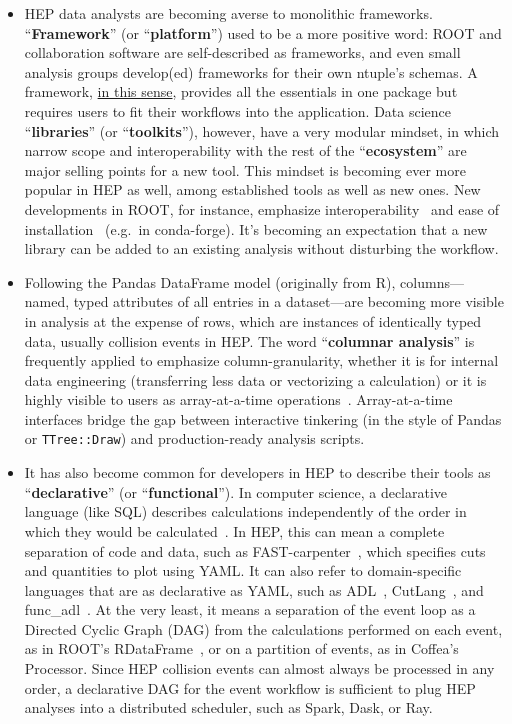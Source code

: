\documentclass[12pt,a4paper]{article}
\begin{document}
\begin{itemize}
\item HEP data analysts are becoming averse to monolithic frameworks. ``{\bf Framework}'' (or ``{\bf platform}'') used to be a more positive word: ROOT and collaboration software are self-described as frameworks, and even small analysis groups develop(ed) frameworks for their own ntuple's schemas. A framework, \href{https://root.cern.ch/root/htmldoc/guides/users-guide/ROOTUsersGuide.html#the-framework}{in this sense}, provides all the essentials in one package but requires users to fit their workflows into the application. Data science ``{\bf libraries}'' (or ``{\bf toolkits}''), however, have a very modular mindset, in which narrow scope and interoperability with the rest of the ``{\bf ecosystem}'' are major selling points for a new tool. This mindset is becoming ever more popular in HEP as well, among established tools as well as new ones. New developments in ROOT, for instance, emphasize interoperability~\cite{ROOTTeam:2020jal} and ease of installation~\cite{Shadura_2020} (e.g.\ in conda-forge). It's becoming an expectation that a new library can be added to an existing analysis without disturbing the workflow.

\item Following the Pandas DataFrame model (originally from R), columns---named, typed attributes of all entries in a dataset---are becoming more visible in analysis at the expense of rows, which are instances of identically typed data, usually collision events in HEP. The word ``{\bf columnar analysis}'' is frequently applied to emphasize column-granularity, whether it is for internal data engineering (transferring less data or vectorizing a calculation) or it is highly visible to users as array-at-a-time operations~\cite{Hartmann:2021qzp}. Array-at-a-time interfaces bridge the gap between interactive tinkering (in the style of Pandas or {\tt TTree::Draw}) and production-ready analysis scripts.

\item It has also become common for developers in HEP to describe their tools as ``{\bf declarative}'' (or ``{\bf functional}''). In computer science, a declarative language (like SQL) describes calculations independently of the order in which they would be calculated~\cite{10.5555/895948}. In HEP, this can mean a complete separation of code and data, such as FAST-carpenter~\cite{krikler2020fast}, which specifies cuts and quantities to plot using YAML. It can also refer to domain-specific languages that are as declarative as YAML, such as ADL~\cite{Sekmen:2020vph}, CutLang~\cite{Unel:2021edl}, and func\_adl~\cite{Proffitt:2021wfh}. At the very least, it means a separation of the event loop as a Directed Cyclic Graph (DAG) from the calculations performed on each event, as in ROOT's RDataFrame~\cite{Piparo:2019xdy}, or on a partition of events, as in Coffea's Processor. Since HEP collision events can almost always be processed in any order, a declarative DAG for the event workflow is sufficient to plug HEP analyses into a distributed scheduler, such as Spark, Dask, or Ray.
\end{itemize}
\end{document}
